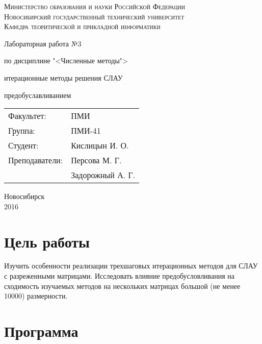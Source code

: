 \documentclass[oneside, final, 12pt]{extarticle}
\begin{document}
\begin{titlepage}
	\begin{centering}
		\textsc{Министерство образования и науки Российской Федерации}\\
		\textsc{Новосибирский государственный технический университет}\\
		\textsc{Кафедра теоритической и прикладной информатики}\\
	\end{centering}
	\vfill
	\vfill
	\vfill
	\Large
	\centerline{Лабораторная работа №3}
	\centerline{по дисциплине "<Численные методы">}
	\centerline{ итерационные методы решения СЛАУ}
	\centerline{ предобуславливанием}
	\normalsize
	\vfill
	\vfill
	\vfill
	\begin{flushleft}
		\begin{minipage}{0.3\textwidth}
			\begin{tabular}{l l}
				Факультет: & ПМИ\\
				Группа: & ПМИ-41\\
				Студент: & Кислицын И. О.\\
				Преподаватели: & Персова М. Г.\\
				~ & Задорожный А. Г. 
			\end{tabular}
		\end{minipage}
	\end{flushleft}
	\vfill
	\vfill
	\begin{centering}
		Новосибирск\\
		2016\\
	\end{centering}
\end{titlepage}
\setcounter{page}{2}
\lstset{
	breaklines=\true,
	basicstyle=\footnotesize\ttfamily,
	tabsize=2,
	showspaces=\false,
	breaklines=\true,
	breakatwhitespace=\true,
	extendedchars=\true,
	keepspaces=\true,
	language=Haskell
}
\section{Цель работы}

Изучить особенности реализации трехшаговых итерационных методов для СЛАУ с разреженными матрицами. Исследовать влияние предобусловливания на сходимость изучаемых методов на нескольких матрицах большой (не менее 10000) размерности.

\section{Программа}
\end{document}
